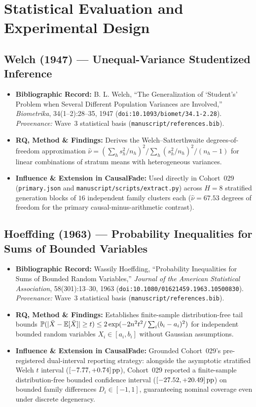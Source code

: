 \section{Statistical Evaluation and Experimental Design}

\subsection{Welch (1947) --- Unequal-Variance Studentized Inference \citep{welch1947generalization}}
\begin{itemize}
  \item \textbf{Bibliographic Record:} B. L. Welch, ``The Generalization of `Student's' Problem when Several Different Population Variances are Involved,'' \emph{Biometrika}, 34(1--2):28--35, 1947 (\texttt{doi:10.1093/biomet/34.1-2.28}). \emph{Provenance:} Wave~3 statistical basis (\texttt{manuscript/references.bib}).
  \item \textbf{RQ, Method \& Findings:} Derives the Welch--Satterthwaite degrees-of-freedom approximation $\hat{\nu} = (\sum_h s_h^2/n_h)^2 / \sum_h (s_h^2/n_h)^2/(n_h-1)$ for linear combinations of stratum means with heterogeneous variances.
  \item \textbf{Influence \& Extension in CausalFade:} Used directly in Cohort~029 (\texttt{primary.json} and \texttt{manuscript/scripts/extract.py}) across $H=8$ stratified generation blocks of $16$ independent family clusters each ($\hat{\nu} = 67.53$ degrees of freedom for the primary causal-minus-arithmetic contrast).
\end{itemize}

\subsection{Hoeffding (1963) --- Probability Inequalities for Sums of Bounded Variables \citep{hoeffding1963probability}}
\begin{itemize}
  \item \textbf{Bibliographic Record:} Wassily Hoeffding, ``Probability Inequalities for Sums of Bounded Random Variables,'' \emph{Journal of the American Statistical Association}, 58(301):13--30, 1963 (\texttt{doi:10.1080/01621459.1963.10500830}). \emph{Provenance:} Wave~3 statistical basis (\texttt{manuscript/references.bib}).
  \item \textbf{RQ, Method \& Findings:} Establishes finite-sample distribution-free tail bounds $\mathbb{P}(|\bar{X} - \mathbb{E}[\bar{X}]| \ge t) \le 2\exp(-2 n^2 t^2 / \sum_i (b_i - a_i)^2)$ for independent bounded random variables $X_i \in [a_i, b_i]$ without Gaussian assumptions.
  \item \textbf{Influence \& Extension in CausalFade:} Grounded Cohort~029's pre-registered dual-interval reporting strategy: alongside the asymptotic stratified Welch $t$ interval ($[-7.77, +0.74]\,\mathrm{pp}$), Cohort~029 reported a finite-sample distribution-free bounded confidence interval ($[-27.52, +20.49]\,\mathrm{pp}$) on bounded family differences $D_i \in [-1, 1]$, guaranteeing nominal coverage even under discrete degeneracy.
\end{itemize}
